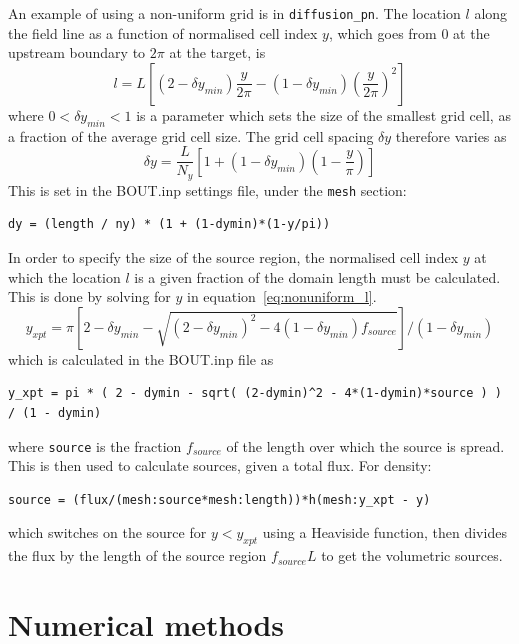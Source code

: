 \documentclass[12pt,a4paper]{article}
\begin{document}
An example of using a non-uniform grid is in \texttt{diffusion\_pn}.
The location $l$ along the field line as a function of normalised cell index $y$,
which goes from $0$ at the upstream boundary to $2\pi$ at the target, is
\begin{equation}
  l = L\left[ \left(2 - \delta y_{min}\right)\frac{y}{2\pi} -\left(1-\delta y_{min}\right)\left(\frac{y}{2\pi}\right)^2\right]
\label{eq:nonuniform_l}
\end{equation}
where $0<\delta y_{min}<1$ is a parameter which sets the size of the smallest grid cell, as a fraction
of the average grid cell size. The grid cell spacing $\delta y$ therefore varies as 
\begin{equation}
\delta y = \frac{L}{N_y} \left[ 1 + \left(1-\delta y_{min}\right)\left(1-\frac{y}{\pi}\right)\right]
\end{equation}
This is set in the BOUT.inp settings file, under the \texttt{mesh} section:
\begin{verbatim}
dy = (length / ny) * (1 + (1-dymin)*(1-y/pi))
\end{verbatim}
In order to specify the size of the source region, the normalised cell index $y$ at which
the location $l$ is a given fraction of the domain length must be calculated. This is done by
solving for $y$ in equation~\ref{eq:nonuniform_l}.
\begin{equation}
y_{xpt} = \pi\left[2 - \delta y_{min} - \sqrt{\left(2-\delta y_{min}\right)^2 - 4\left(1-\delta y_{min}\right) f_{source}}\right]/\left(1-\delta y_{min}\right)
\end{equation}
which is calculated in the BOUT.inp file as
\begin{verbatim}
y_xpt = pi * ( 2 - dymin - sqrt( (2-dymin)^2 - 4*(1-dymin)*source ) ) / (1 - dymin)
\end{verbatim}
where \texttt{source} is the fraction $f_{source}$ of the length over which the source is spread.
This is then used to calculate sources, given a total flux. For density:
\begin{verbatim}
source = (flux/(mesh:source*mesh:length))*h(mesh:y_xpt - y)
\end{verbatim}
which switches on the source for $y < y_{xpt}$ using a Heaviside function, then divides the flux
by the length of the source region $f_{source}L$ to get the volumetric sources.

\section{Numerical methods}
\end{document}
